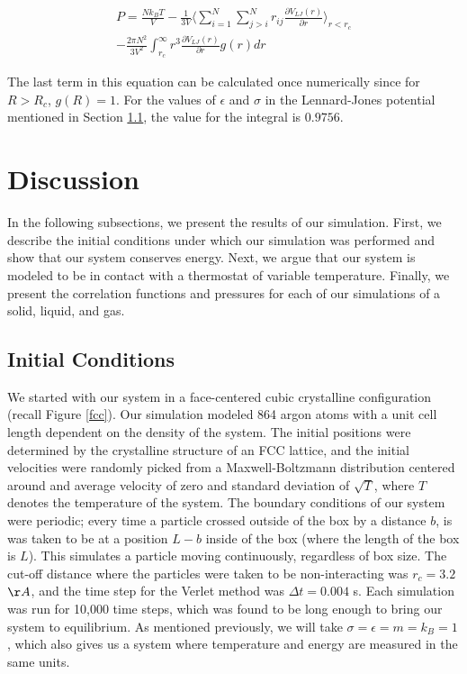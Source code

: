 \documentclass{article}
\begin{document}
\begin{multicols}{2}
\begin{equation}
\begin{split}
P = \frac{N k_B T}{V} - \frac{1}{3 V} \langle \sum\limits_{i=1}^N \sum\limits_{j>i}^N r_{ij} \frac{\partial V_{LJ}(r)}{\partial r}\rangle_{r < r_c} \\
- \frac{2 \pi N^2}{3 V^2} \int_{r_c}^\infty r^3 \frac{\partial V_{LJ}(r)}{\partial r} g(r) dr
\label{prescomp}
\end{split}
\end{equation}

\noindent The last term in this equation can be calculated once numerically since for $R>R_c$, $g(R) = 1$. For the values of $\epsilon$ and $\sigma$ in the Lennard-Jones potential mentioned in Section \ref{IC}, the value for the integral is $0.9756$.

\section{Discussion}
\label{disc}

In the following subsections, we present the results of our simulation.  First, we describe the initial conditions under which our simulation was performed and show that our system conserves energy.  Next, we argue that our system is modeled to be in contact with a thermostat of variable temperature.  Finally, we present the correlation functions and pressures for each of our simulations of a solid, liquid, and gas.

\subsection{Initial Conditions}
\label{IC}

We started with our system in a face-centered cubic crystalline configuration (recall Figure \ref{fcc}).  Our simulation modeled 864 argon atoms with a unit cell length dependent on the density of the system.  The initial positions were determined by the crystalline structure of an FCC lattice, and the initial velocities were randomly picked from a Maxwell-Boltzmann distribution centered around and average velocity of zero and standard deviation of $\sqrt{T}$, where $T$ denotes the temperature of the system.  The boundary conditions of our system were periodic; every time a particle crossed outside of the box by a distance $b$, is was taken to be at a position $L-b$ inside of the box (where the length of the box is $L$).  This simulates a particle moving continuously, regardless of box size.  The cut-off distance where the particles were taken to be non-interacting was $r_c = 3.2$ $\AA$, and the time step for the Verlet method was $\Delta t = 0.004$ s.  Each simulation was run for 10,000 time steps, which was found to be long enough to bring our system to equilibrium.  As mentioned previously, we will take $\sigma=\epsilon=m=k_B=1$, which also gives us a system where temperature and energy are measured in the same units.  


\end{multicols}
\end{document}
